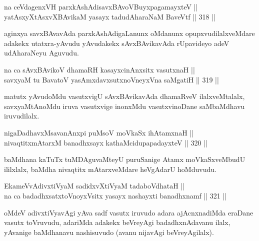 \begin{shl}
na ceVdagenxVH parxkAshAdisavxBAvoV\s BuyxpagamayxteV || \\
yatAsxyXtAsxvXBAvikaM yasayx tadudAharaNaM BaveVtf ||  318 ||  
\end{shl}

\begin{artha}
aginxya savxBAvavAda parxkAshAdigaLanunx oMdanunx
opupxvudilalxveMdare adakekx utatxra-yAvudu yAvudakekx sAvxBAvikavAda
rUpavideyo adeV udAharaNeyu Aguvudu.
\end{artha}

\begin{shl}
na ca sAvxBAvikoV dhamaRH kasayxcinAnxsitx vasutxnaH || \\
savxyaM tu BavatoV yasAmxdavxsutxnoV\s neyxVna saMgatiH ||  319 ||  
\end{shl}

\begin{artha}
matutx yAvudoMdu vasutxvigU sAvxBAvikavAda dhamaRveV ilalxveMtalalx,
savxyaMtAnoMdu iruva vasutxvige inonxMdu vasutxvinoDane saMbaMdhavu
iruvudilalx.
\end{artha}

\begin{shl}
nigaDadhavxMsavanAnxpi puMsoV moVkaSx ihA\s \s tamxnaH ||  \\
nivaqtitxmAtarxM banadhxsayx kathaMcidupapadayxteV ||  320 ||  
\end{shl}

\begin{artha}
baMdhana kaTuTx tuMDAguvaMteyU puruSanige Atamx moVkaSxveMbudU
ililxlalx, baMdha nivaqtitx mAtarxveMdare heVgAdarU hoMduvudu.
\end{artha}

\begin{shl}
EkameVvAdivxtiVyaM sadidxvXtiVyaM tadaboVdhataH || \\
na ca badadhxsatxtoV\s noyxV\s sitx yasayx nashayxti banadhxnamf ||  321 ||  
\end{shl}

\begin{artha}
oMdeV adivxtiVyavAgi yAva sadf vasutx iruvudo adara ajAcnxnadiMda
eraDane vasutx toVruvudu, adariMda adakekx beVreyAgi badadhxnAdavanu
ilalx, yAvanige baMdhanavu nashisuvudo (avanu nijavAgi beVreyAgilalx).
\end{artha}


